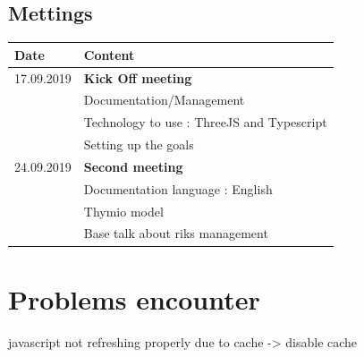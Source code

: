 \documentclass{scrartcl}
\begin{document}
\subsection{Mettings}
\begin{tabular}{ | m{3cm} | m{10cm} | }
  \hline
  Date & Content \\
  \hline
  17.09.2019 & \textbf{Kick Off meeting}\\
  & Documentation/Management\\
  & Technology to use : ThreeJS and Typescript\\
  & Setting up the goals\\
  \hline
  24.09.2019 & \textbf{Second meeting} \\
  & Documentation language : English \\
  & Thymio model \\
  & Base talk about riks management \\
  \hline
\end{tabular}

\listoffigures

\listoftables

\section{Problems encounter}
javascript not refreshing properly due to cache -> disable cache

\printbibliography[heading=bibintoc]
\end{document}
